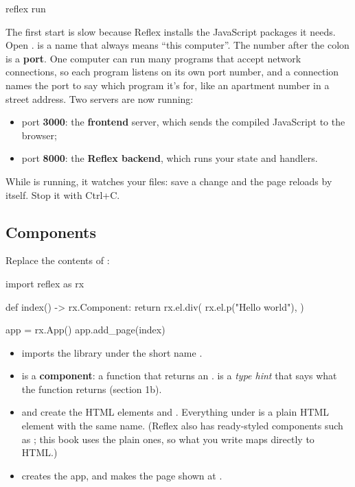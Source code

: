 \begin{code}
reflex run
\end{code}

The first start is slow because Reflex installs the JavaScript packages it needs. Open .  is a name that always means ``this computer''. The number after the colon is a \textbf{port}. One computer can run many programs that accept network connections, so each program listens on its own port number, and a connection names the port to say which program it's for, like an apartment number in a street address. Two servers are now running:

\begin{itemize}
\item port \textbf{3000}: the \textbf{frontend} server, which sends the compiled JavaScript to the browser;
\item port \textbf{8000}: the \textbf{Reflex backend}, which runs your state and handlers.
\end{itemize}

While  is running, it watches your files: save a change and the page reloads by itself. Stop it with Ctrl+C.

\subsection{Components}

Replace the contents of :

\begin{py}
import reflex as rx


def index() -> rx.Component:
	return rx.el.div(
		rx.el.p("Hello world"),
	)


app = rx.App()
app.add_page(index)
\end{py}

\begin{itemize}
\item {} imports the library under the short name .
\item {} is a \textbf{component}: a function that returns an .  is a \emph{type hint} that says what the function returns (section 1b).
\item {} and  create the HTML elements  and . Everything under  is a plain HTML element with the same name. (Reflex also has ready-styled components such as ; this book uses the plain  ones, so what you write maps directly to HTML.)
\item {} creates the app, and  makes  the page shown at \cd{/}.
\end{itemize}

